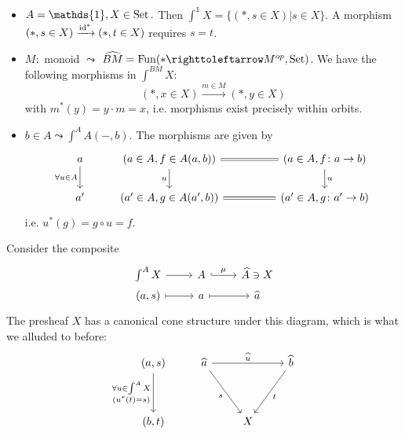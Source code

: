 \begin{exmp}
\begin{itemize}
    \item $A=\mathds{1}, X\in \Set.$ Then $\int^\mathds{1} X= \{(\ast,s\in X)\vert s\in X\}.$ A morphism $(\ast,s\in X)\xrightarrow{\operatorname{id}^*}(\ast,t\in X)$ requires $s=t$.
    
    \item $M\colon$ monoid $\leadsto$ $\widehat{BM}=\Fun(\ast\righttoleftarrow M^{op},\Set)$. We have the following morphisms in $\int^{BM} X:$ 
    \[(\ast,x\in X)\xrightarrow{m\in M}(\ast,y\in X)\] with $m^*(y)=y\cdot m = x$, i.e. morphisms exist precisely within orbits.
    \item $b\in A\leadsto \int^A A(-,b).$ The morphisms are given by
    \[
        \begin{tikzcd}
        a \arrow[d, "\forall u\in A"'] & {(a\in A, f\in A(a,b))} \arrow[d, "u"'] \arrow[rr, Rightarrow,no head] &  & {(a\in A, f\colon a\to b)} \arrow[d, "u"] \\
        a'                             & {(a'\in A, g\in A(a',b))} \arrow[rr, Rightarrow,no head]               &  & {(a'\in A, g\colon a'\to b)}             
        \end{tikzcd}
    \] i.e. $u^*(g)=g\circ u = f$.
    \end{itemize}
\end{exmp}

Consider the composite 
\[
    \begin{tikzcd}[row sep= 1pt]
    \int^A X \arrow[r]         & A \arrow[r, "\mu", hook] & \widehat{A}\ni X \\
    {(a,s)} \arrow[r, maps to] & a \arrow[r, maps to]     & \widehat{a}     
    \end{tikzcd}
\]
The presheaf $X$ has a canonical cone structure under this diagram, which is what we alluded to before: 
\[
    \begin{tikzcd}
    {(a,s)} \arrow[dd, "\substack{\forall u \in \int^AX\\(u^*(t)=s)}"'] & \widehat{a} \arrow[rr, "\widehat{u}"] \arrow[rdd, "s"'] &   & \widehat{b} \arrow[ldd, "t"] \\
                                                                        &                                                 &   &                          \\
    {(b,t)}                                                             &                                                 & X &                         
    \end{tikzcd}
\]

